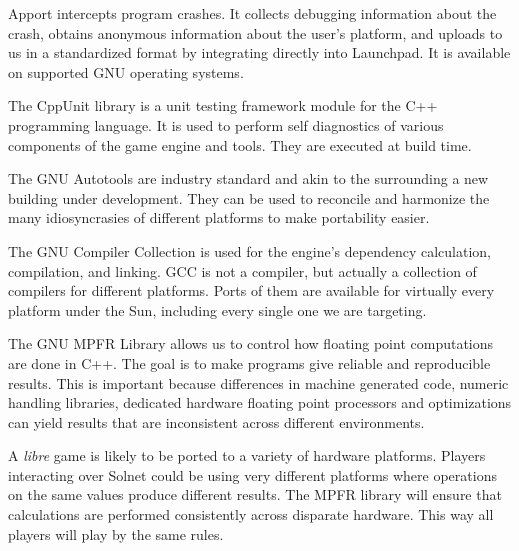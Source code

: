 

\startitemize[4]

Apport intercepts program crashes. It collects debugging information about the crash, obtains anonymous information about the user's platform, and uploads to us in a standardized format by integrating directly into Launchpad. It is available on supported GNU operating systems.


The CppUnit library is a unit testing framework module for the C++ programming language. It is used to perform self diagnostics of various components of the game engine and tools. They are executed at build time.


The GNU Autotools are industry standard and akin to the  surrounding a new building under development. They can be used to reconcile and harmonize the many idiosyncrasies of different platforms to make  portability easier.


The GNU Compiler Collection is used for the engine's dependency calculation, compilation, and linking. GCC is not a compiler, but actually a collection of compilers for different platforms. Ports of them are available for virtually every platform under the Sun, including every single one we are targeting.


The GNU MPFR Library allows us to control how floating point computations are done in C++. The goal is to make programs give reliable and reproducible results. This is important because differences in machine generated code, numeric handling libraries, dedicated hardware floating point processors and optimizations can yield results that are inconsistent across different environments.

A {\it libre} game is likely to be ported to a variety of hardware platforms. Players interacting over Solnet could be using very different platforms where operations on the same values produce different results. The MPFR library will ensure that calculations are performed consistently across disparate hardware. This way all players will play by the same rules.
\stopitemize

